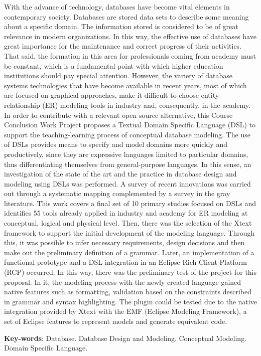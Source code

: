 \begin{resumo}[Abstract]
With the advance of technology, databases have become vital elements in contemporary society.
Databases are stored data sets to describe some meaning about a specific domain.
The information stored is considered to be of great relevance in modern organizations.
In this way, the effective use of databases have great importance for the maintenance and correct progress of their activities.
That said, the formation in this area for professionals coming from academy must be constant, which is a fundamental point with which higher education institutions should pay special attention.
However, the variety of database systems technologies that have become available in recent years, most of which are focused on graphical approaches, make it difficult to choose entity-relationship (ER) modeling tools in industry and, consequently, in the academy.
In order to contribute with a relevant open source alternative, this Course Conclusion Work Project proposes a Textual Domain Specific Language (DSL) to support the teaching-learning process of conceptual database modeling.
The use of DSLs provides means to specify and model domains more quickly and productively, since they are expressive languages limited to particular domains, thus differentiating themselves from general-purpose languages.
In this sense, an investigation of the state of the art and the practice in database design and modeling using DSLs was performed.
A survey of recent innovations was carried out through a systematic mapping complemented by a survey in the gray literature.
This work covers a final set of 10 primary studies focused on DSLs and identifies 55 tools already applied in industry and academy for ER modeling at conceptual, logical and physical level.
Then, there was the selection of the Xtext framework to support the initial development of the modeling language.
Through this, it was possible to infer necessary requirements, design decisions and then make out the preliminary definition of a grammar.
Later, an implementation of a functional prototype and a DSL integration in an Eclipse Rich Client Platform (RCP) occurred.
In this way, there was the preliminary test of the project for this proposal. In it, the modeling process with the newly created language gained native features such as formatting, validation based on the constraints described in grammar and syntax highlighting.
The plugin could be tested due to the native integration provided by Xtext with the EMF (Eclipse Modeling Framework), a set of Eclipse features to represent models and generate equivalent code.

 \vspace{\onelineskip}
 
 \noindent 
 \textbf{Key-words}: Database. Database Design and Modeling. Conceptual Modeling. Domain Specific Language.
\end{resumo}
